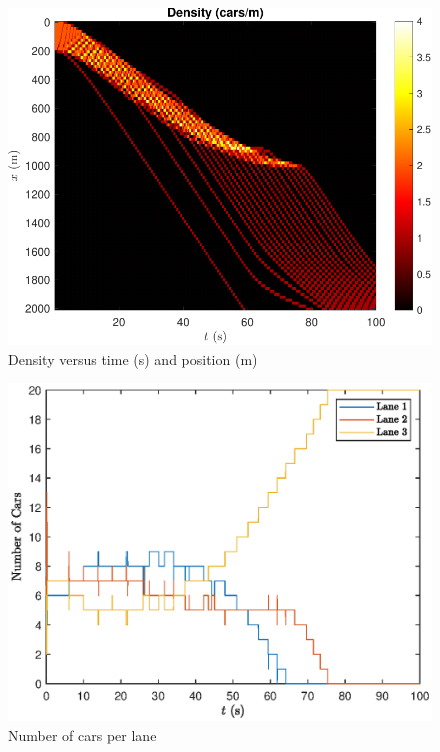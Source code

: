 \documentclass[12pt]{article}
\begin{document}
    \begin{figure}[H]
      \begin{center}
        \includegraphics[width=13cm]{mlbn_density.pdf}
        \caption{Density versus time (s) and position (m)}
        \label{fig:multi lane density}
      \end{center}
    \end{figure}

    \begin{figure}[H]
      \begin{center}
        \includegraphics[width=13cm]{mlbn_lanecars.eps}
        \caption{Number of cars per lane}
        \label{fig:num cars per lane}
      \end{center}
    \end{figure}
\end{document}
